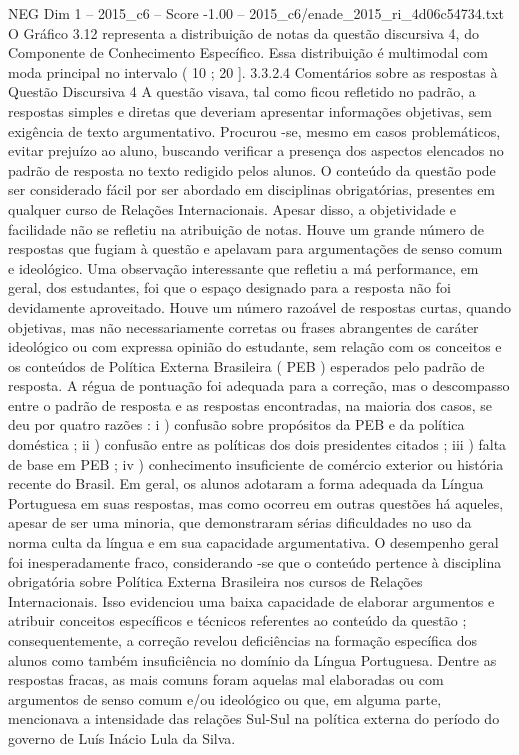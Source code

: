 \begin{textsample}{NEG Dim 1 – 2015\_c6 – Score -1.00 – 2015\_c6/enade\_2015\_ri\_4d06c54734.txt}
O Gráfico 3.12 representa a distribuição de notas da questão discursiva 4, do Componente de Conhecimento Específico.
Essa distribuição é multimodal com moda principal no intervalo ( 10 ; 20 ]. 3.3.2.4 Comentários sobre as respostas à Questão Discursiva 4 A questão visava, tal como ficou refletido no padrão, a respostas simples e diretas que deveriam apresentar informações objetivas, sem exigência de texto argumentativo.
Procurou -se, mesmo em casos problemáticos, evitar prejuízo ao aluno, buscando verificar a presença dos aspectos elencados no padrão de resposta no texto redigido pelos alunos.
O conteúdo da questão pode ser considerado fácil por ser abordado em disciplinas obrigatórias, presentes em qualquer curso de Relações Internacionais.
Apesar disso, a objetividade e facilidade não se refletiu na atribuição de notas.
Houve um grande número de respostas que fugiam à questão e apelavam para argumentações de senso comum e ideológico.
Uma observação interessante que refletiu a má performance, em geral, dos estudantes, foi que o espaço designado para a resposta não foi devidamente aproveitado.
Houve um número razoável de respostas curtas, quando objetivas, mas não necessariamente corretas ou frases abrangentes de caráter ideológico ou com expressa opinião do estudante, sem relação com os conceitos e os conteúdos de Política Externa Brasileira ( PEB ) esperados pelo padrão de resposta.
A régua de pontuação foi adequada para a correção, mas o descompasso entre o padrão de resposta e as respostas encontradas, na maioria dos casos, se deu por quatro razões : i ) confusão sobre propósitos da PEB e da política doméstica ; ii ) confusão entre as políticas dos dois presidentes citados ; iii ) falta de base em PEB ; iv ) conhecimento insuficiente de comércio exterior ou história recente do Brasil.
Em geral, os alunos adotaram a forma adequada da Língua Portuguesa em suas respostas, mas como ocorreu em outras questões há aqueles, apesar de ser uma minoria, que demonstraram sérias dificuldades no uso da norma culta da língua e em sua capacidade argumentativa.
O desempenho geral foi inesperadamente fraco, considerando -se que o conteúdo pertence à disciplina obrigatória sobre Política Externa Brasileira nos cursos de Relações Internacionais.
Isso evidenciou uma baixa capacidade de elaborar argumentos e atribuir conceitos específicos e técnicos referentes ao conteúdo da questão ; consequentemente, a correção revelou deficiências na formação específica dos alunos como também insuficiência no domínio da Língua Portuguesa.
Dentre as respostas fracas, as mais comuns foram aquelas mal elaboradas ou com argumentos de senso comum e/ou ideológico ou que, em alguma parte, mencionava a intensidade das relações Sul-Sul na política externa do período do governo de Luís Inácio Lula da Silva.

\end{textsample}
